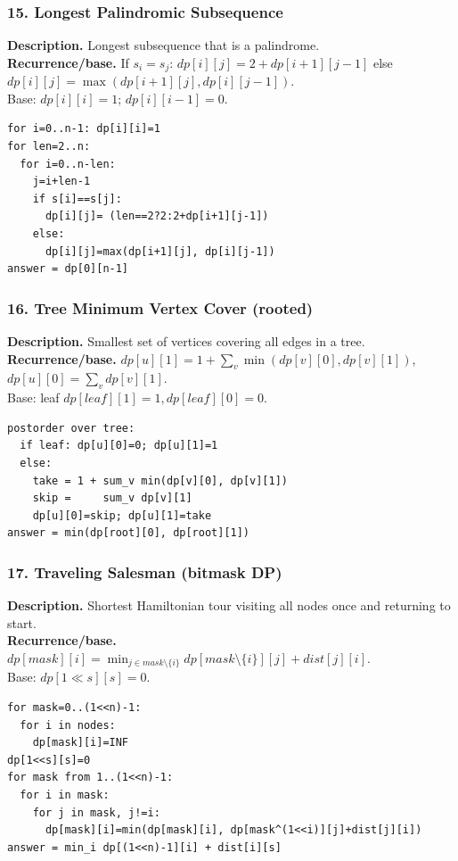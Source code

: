 \documentclass[9pt]{extarticle}
\begin{document}
\subsubsection{15. Longest Palindromic Subsequence}
\textbf{Description.} Longest subsequence that is a palindrome.\\
\textbf{Recurrence/base.} If \(s_i=s_j\): \(dp[i][j]=2+dp[i+1][j-1]\) else \(dp[i][j]=\max(dp[i+1][j],dp[i][j-1])\).  \\
Base: \(dp[i][i]=1\); \(dp[i][i-1]=0\).
\begin{verbatim}
for i=0..n-1: dp[i][i]=1
for len=2..n:
  for i=0..n-len:
    j=i+len-1
    if s[i]==s[j]:
      dp[i][j]= (len==2?2:2+dp[i+1][j-1])
    else:
      dp[i][j]=max(dp[i+1][j], dp[i][j-1])
answer = dp[0][n-1]
\end{verbatim}

\subsubsection{16. Tree Minimum Vertex Cover (rooted)}
\textbf{Description.} Smallest set of vertices covering all edges in a tree.\\
\textbf{Recurrence/base.} \(dp[u][1]=1+\sum_{v} \min(dp[v][0],dp[v][1])\),  \\
\(dp[u][0]=\sum_{v} dp[v][1]\). \\
Base: leaf \(dp[leaf][1]=1, dp[leaf][0]=0\).
\begin{verbatim}
postorder over tree:
  if leaf: dp[u][0]=0; dp[u][1]=1
  else:
    take = 1 + sum_v min(dp[v][0], dp[v][1])
    skip =     sum_v dp[v][1]
    dp[u][0]=skip; dp[u][1]=take
answer = min(dp[root][0], dp[root][1])
\end{verbatim}

\subsubsection{17. Traveling Salesman (bitmask DP)}
\textbf{Description.} Shortest Hamiltonian tour visiting all nodes once and returning to start.\\
\textbf{Recurrence/base.} \(dp[mask][i]=\min_{j \in mask\setminus\{i\}} dp[mask\setminus\{i\}][j]+dist[j][i]\).  \\
Base: \(dp[1\ll s][s]=0\).
\begin{verbatim}
for mask=0..(1<<n)-1:
  for i in nodes:
    dp[mask][i]=INF
dp[1<<s][s]=0
for mask from 1..(1<<n)-1:
  for i in mask:
    for j in mask, j!=i:
      dp[mask][i]=min(dp[mask][i], dp[mask^(1<<i)][j]+dist[j][i])
answer = min_i dp[(1<<n)-1][i] + dist[i][s]
\end{verbatim}
\end{document}
